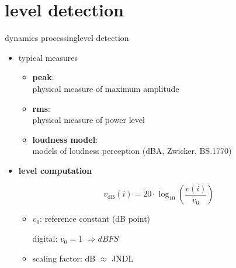 \section{level detection}
\begin{frame}{dynamics processing}{level detection}
	\vspace{-3mm}
    \begin{itemize}
        \item typical measures
    \begin{itemize}
		\item	\textbf{peak}:\\ physical measure of maximum amplitude
		\item	\textbf{rms}:\\ physical measure of power level
		\item	\textbf{loudness model}:\\ models of loudness perception (dBA, Zwicker, BS.1770)
		\vspace{5mm}
    \end{itemize}
    \pause
    \item   \textbf{level computation}

		\begin{equation*}
			v_\mathrm{dB}(i) = 20\cdot\log_{10}\left(\frac{v(i)}{v_0}\right)
		\end{equation*}
	
		\pause
		\begin{itemize}
			\item	$v_0$: reference constant (\unit[0]{dB} point)
			
					digital: $v_0 = 1$ $\Rightarrow \unit{dBFS}$
			\item	scaling	factor: \unit[1]{dB} $\approx$ JNDL
		\end{itemize}

	\end{itemize}
\end{frame}
